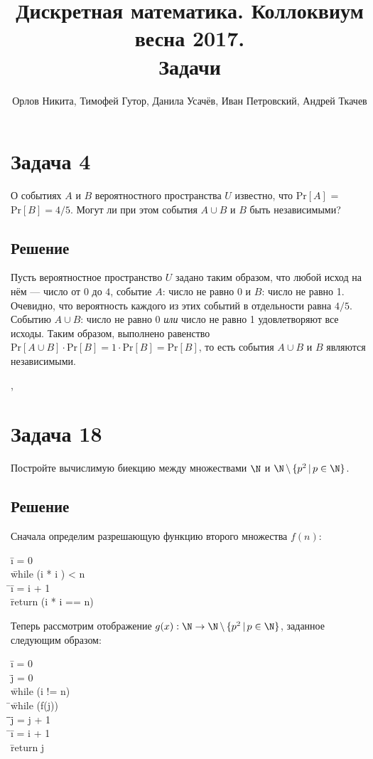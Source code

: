 \documentclass[a4paper,12pt]{article}
\newcommand {\gu} [1] {\guillemotleft#1\guillemotright}
\renewcommand{\Pr} {\text {Pr}}
\newcommand{\tab}{\quad\=}
\newenvironment{programm}{
    \ttfamily
    \smallskip
    \begin{tabbing}
    }
    {
    \end{tabbing}
    \smallskip
}
\begin{document}
	\title{Дискретная математика. Коллоквиум весна 2017. \\ Задачи}
    \author{Орлов Никита, Тимофей Гутор, Данила Усачёв, Иван Петровский, Андрей Ткачев}
	\maketitle
	
	\section*{Задача 4}
	О событиях $A$ и $B$ вероятностного пространства $U$ известно, что $\Pr [A]$ = $\Pr [B] = 4/5$. Могут ли при этом события $A\cup B$ и $B$ быть независимыми?
	
	\subsection*{Решение}
	Пусть вероятностное пространство $U$ задано таким образом, что любой исход на нём --- число от $0$ до $4$, событие $A$: \gu{число не равно 0} и $B$: \gu{число не равно 1}. Очевидно, что вероятность каждого из этих событий в отдельности равна $4/5$. Событию $A\cup B$: \gu{число не равно 0 \textit{или} число не равно 1} удовлетворяют все исходы. Таким образом, выполнено равенство $\Pr [A\cup B]\cdot\Pr [B]=1\cdot\Pr [B] = \Pr[B]$, то есть события $A\cup B$ и $B$ являются независимыми.
	
	\sep
	\section*{Задача 18}
	Постройте вычислимую биекцию между множествами $\N$ и $\N\,\backslash\,\{p^2\,|\,p\in\N\}$.
	\subsection*{Решение}
	Сначала определим разрешающую функцию второго множества $f(n)$:
    \begin{programm}
    \tab i = 0\\
    \tab while (i * i ) < n\\
    \tab\tab i = i + 1\\
    \tab return (i * i == n)
    \end{programm}
    Теперь рассмотрим отображение $g(x): \N\to\N\,\backslash\,\{p^2\,|\,p\in\N\}$, заданное следующим образом:
	
    \begin{programm}
    \tab i = 0\\
    \tab j = 0\\
    \tab while (i != n)\\
    \tab\tab while (f(j))\\
    \tab\tab\tab j = j + 1\\
    \tab\tab i = i + 1\\
    \tab return j
    \end{programm}
	
\end{document}
